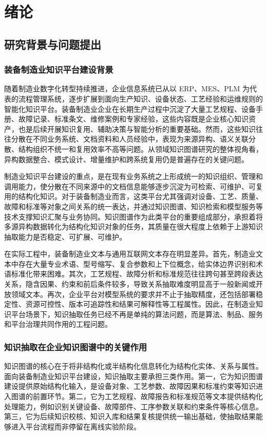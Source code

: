 \chapter{绪论}

\section{研究背景与问题提出}
\subsection{装备制造业知识平台建设背景}
随着制造业数字化转型持续推进，企业信息系统已从以 ERP、MES、PLM 为代表的流程管理系统，逐步扩展到面向生产知识、设备状态、工艺经验和运维规则的智能化知识平台。装备制造业企业在长期生产过程中沉淀了大量工艺规程、设备手册、故障记录、标准条文、维修案例和专家经验，这些内容既是企业核心知识资产，也是后续开展知识复用、辅助决策与智能分析的重要基础。然而，这些知识往往分散在不同业务系统、文档资料和人员经验中，表现为来源异构、语义关联分散、结构组织不统一和复用效率不高等问题\cite{manufacturingadoption2023,dskgsurvey2021}。从领域知识图谱研究的整体视角看，异构数据整合、模式设计、增量维护和跨系统复用仍是普遍存在的关键问题\cite{dskgsurvey2021}。

制造业知识平台建设的重点，是在现有业务系统之上形成统一的知识组织、管理和调用能力，使分散在不同来源中的文档信息能够逐步沉淀为可检索、可维护、可复用的结构化知识。对于装备制造业而言，这类平台尤其强调对设备、工艺、质量、故障和标准等对象之间关系的统一表达，并通过知识图谱、知识检索和模型服务等技术支撑知识汇聚与业务协同。知识图谱作为此类平台的重要组成部分，承担着将多源异构数据转化为结构化知识对象的任务，其质量在很大程度上依赖于上游知识抽取能力是否稳定、可扩展、可维护。

在实际工程中，装备制造业文本与通用互联网文本存在明显差异。首先，制造业文本中存在大量专业术语、型号缩写、复合参数和上下位概念，给实体边界识别和术语标准化带来困难。其次，工艺规程、故障分析和标准规范往往跨句甚至跨段表达关系，隐含因果、约束和前后条件较多，导致关系抽取难度明显高于一般新闻或开放领域文本。再次，企业平台对模型系统的要求并不止于抽取精度，还包括部署稳定性、资源可控性、版本可追踪性和结果可解释性等工程属性。因此，在制造业知识平台场景下，知识抽取任务已经不再是单纯的算法问题，而是算法、制品、服务和平台治理共同作用的工程问题。

\subsection{知识抽取在企业知识图谱中的关键作用}
知识图谱的核心在于将非结构化或半结构化信息转化为结构化实体、关系与属性。面向装备制造业知识平台建设，知识抽取主要承担三类作用。第一，它为知识图谱建设提供原始结构化输入，是设备对象、工艺参数、故障因果和标准约束等知识进入图谱的前置环节。第二，它为工艺规程、故障报告和标准规范等文本提供结构化处理能力，例如识别关键设备、故障部件、工序参数关联和约束条件等核心信息。第三，它为后续知识校核、知识入库和结果复核提供统一输出基础，使抽取结果能够进入平台流程而非停留在离线实验阶段。

